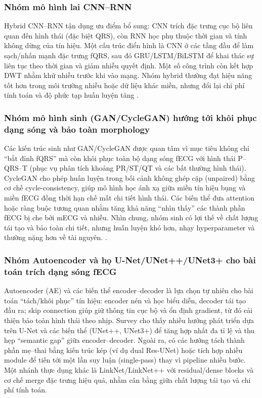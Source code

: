 \documentclass[../DoAn.tex]{subfiles}
\begin{document}
\subsubsection{Nhóm mô hình lai CNN--RNN}
Hybrid CNN--RNN tận dụng ưu điểm bổ sung: CNN trích đặc trưng cục bộ liên quan đến hình thái (đặc biệt QRS), còn RNN học phụ thuộc thời gian và tính không dừng của tín hiệu. Một cấu trúc điển hình là CNN ở các tầng đầu để làm sạch/nhấn mạnh đặc trưng fQRS, sau đó GRU/LSTM/BiLSTM để khai thác sự liên tục theo thời gian và giảm nhiễu quyết định. Một số công trình còn kết hợp DWT nhằm khử nhiễu trước khi vào mạng. Nhóm hybrid thường đạt hiệu năng tốt hơn trong môi trường nhiễu hoặc dữ liệu khác miền, nhưng đổi lại chi phí tính toán và độ phức tạp huấn luyện tăng \cite{ghonchiCommonSpatialPattern2022,darmawahyuniAccurateFetalQRSComplex2023, darmawahyuniDeepLearningFetal2023}.

\subsubsection{Nhóm mô hình sinh (GAN/CycleGAN) hướng tới khôi phục dạng sóng và bảo toàn morphology}
Các kiến trúc sinh như GAN/CycleGAN được quan tâm vì mục tiêu không chỉ “bắt đỉnh fQRS” mà còn khôi phục toàn bộ dạng sóng fECG với hình thái P--QRS--T (phục vụ phân tích khoảng PR/ST/QT và các bất thường hình thái). CycleGAN cho phép huấn luyện trong bối cảnh không ghép cặp (unpaired) bằng cơ chế cycle-consistency, giúp mô hình học ánh xạ giữa miền tín hiệu bụng và miền fECG đồng thời hạn chế mất chi tiết hình thái. Các biến thể đưa attention hoặc ràng buộc tương quan nhằm tăng khả năng “nhìn thấy” các thành phần fECG bị che bởi mECG và nhiễu. Nhìn chung, nhóm sinh có lợi thế về chất lượng tái tạo và bảo toàn chi tiết, nhưng huấn luyện khó hơn, nhạy hyperparameter và thường nặng hơn về tài nguyên.
\cite{goodfellowGenerativeAdversarialNets2014, zhuUnpairedImageToImageTranslation2017, mohebbianFetalECGExtraction2022, shokouhmandFetalElectrocardiogramExtraction2023}.

\subsubsection{Nhóm Autoencoder và họ U-Net/UNet++/UNet3+ cho bài toán trích dạng sóng fECG}
Autoencoder (AE) và các biến thể encoder--decoder là lựa chọn tự nhiên cho bài toán “tách/khôi phục” tín hiệu: encoder nén và học biểu diễn, decoder tái tạo đầu ra; skip connection giúp giữ thông tin cục bộ và ổn định gradient, từ đó cải thiện bảo toàn hình thái theo nhịp. Survey cho thấy nhiều hướng phát triển dựa trên U-Net và các biến thể (UNet++, UNet3+) để tăng hợp nhất đa tỉ lệ và thu hẹp “semantic gap” giữa encoder--decoder. Ngoài ra, có các hướng tách thành phần mẹ--thai bằng kiến trúc kép (ví dụ dual Res-UNet) hoặc tích hợp nhiều module để tiến tới một lần suy luận (single-pass) thay vì pipeline nhiều bước. Một nhánh thực dụng khác là LinkNet/LinkNet++ với residual/dense blocks và cơ chế merge đặc trưng hiệu quả, nhằm cân bằng giữa chất lượng tái tạo và chi phí tính toán.
\end{document}
